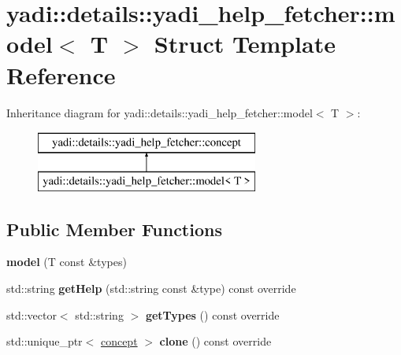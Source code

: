 \hypertarget{structyadi_1_1details_1_1yadi__help__fetcher_1_1model}{}\section{yadi\+:\+:details\+:\+:yadi\+\_\+help\+\_\+fetcher\+:\+:model$<$ T $>$ Struct Template Reference}
\label{structyadi_1_1details_1_1yadi__help__fetcher_1_1model}
Inheritance diagram for yadi\+:\+:details\+:\+:yadi\+\_\+help\+\_\+fetcher\+:\+:model$<$ T $>$\+:\begin{figure}[H]
\begin{center}
\leavevmode
\includegraphics[height=2.000000cm]{structyadi_1_1details_1_1yadi__help__fetcher_1_1model}
\end{center}
\end{figure}
\subsection*{Public Member Functions}
\begin{DoxyCompactItemize}
\item 
\mbox{\label{structyadi_1_1details_1_1yadi__help__fetcher_1_1model_ae7febad4b673cc9087c1c5db808f45ab}} 
{\bfseries model} (T const \&types)
\item 
\mbox{\label{structyadi_1_1details_1_1yadi__help__fetcher_1_1model_a9d821dcf2fbd773b39920b78df593a04}} 
std\+::string {\bfseries get\+Help} (std\+::string const \&type) const override
\item 
\mbox{\label{structyadi_1_1details_1_1yadi__help__fetcher_1_1model_ae399334faaece23170abfe1b88b640f1}} 
std\+::vector$<$ std\+::string $>$ {\bfseries get\+Types} () const override
\item 
\mbox{\label{structyadi_1_1details_1_1yadi__help__fetcher_1_1model_a75b6ce0c4e310bbfb9ff5f508f480094}} 
std\+::unique\+\_\+ptr$<$ \hyperlink{structyadi_1_1details_1_1yadi__help__fetcher_1_1concept}{concept} $>$ {\bfseries clone} () const override
\end{DoxyCompactItemize}
